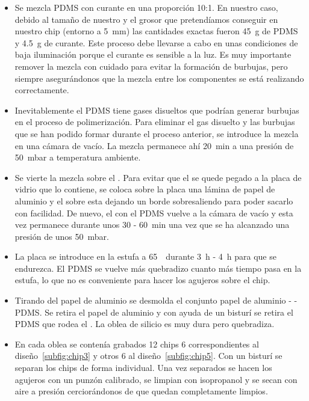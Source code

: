 \begin{itemize}

\item Se mezcla PDMS con curante en una proporción 10:1. En nuestro caso, debido al tamaño de nuestro  y el grosor que pretendíamos conseguir en nuestro chip (entorno a 5~mm) las cantidades exactas fueron 45~g de PDMS y 4.5~g de curante. Este proceso debe llevarse a cabo en unas condiciones de baja iluminación porque el curante es sensible a la luz. Es muy importante remover la mezcla con cuidado para evitar la formación de burbujas, pero siempre asegurándonos que la mezcla entre los componentes se está realizando correctamente.
 
\item Inevitablemente el PDMS tiene gases disueltos que podrían generar burbujas en el proceso de polimerización. Para eliminar el gas disuelto y las burbujas que se han podido formar durante el proceso anterior, se introduce la mezcla en una cámara de vacío. La mezcla permanece ahí 20~min a una presión de 50~mbar a temperatura ambiente.
 
\item Se vierte la mezcla sobre el . Para evitar que el  se quede pegado a la placa de vidrio que lo contiene, se coloca sobre la placa una lámina de papel de aluminio y el  sobre esta dejando un borde sobresaliendo para poder sacarlo con facilidad. De nuevo, el  con el PDMS vuelve a la cámara de vacío y esta vez permanece durante unos 30 - 60~min una vez que se ha alcanzado una presión de unos 50~mbar.
 
\item La placa se introduce en la estufa a 65~\celsius\ durante 3~h - 4~h para que se endurezca. El PDMS se vuelve más quebradizo cuanto más tiempo pasa en la estufa, lo que no es conveniente para hacer los agujeros sobre el chip.
 
\item Tirando del papel de aluminio se desmolda el conjunto papel de aluminio -  - PDMS. Se retira el papel de aluminio y con ayuda de un bisturí se retira el PDMS que rodea el . La oblea de silicio es muy dura pero quebradiza. 
 
\item En cada oblea se contenía grabados 12 chips 6 correspondientes al diseño~\ref{subfig:chip3} y otros 6 al diseño~\ref{subfig:chip5}. Con un bisturí se separan los chips de forma individual. Una vez separados se hacen los agujeros con un punzón calibrado, se limpian con isopropanol y se secan con aire a presión cerciorándonos de que quedan completamente limpios.
 

\end{itemize}
